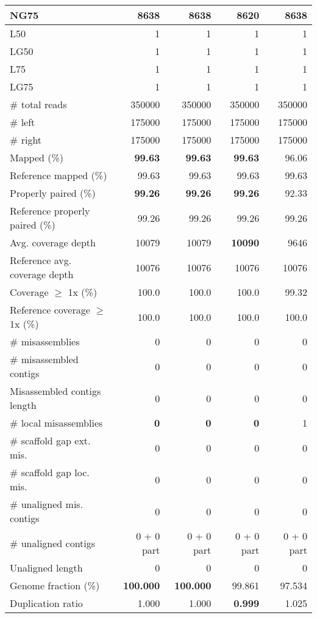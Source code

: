 \documentclass[12pt,a4paper]{article}
\begin{document}
\begin{table}[ht]
\begin{center}
\begin{tabular}{|l*{4}{|r}|}
NG75 & {\bf 8638} & {\bf 8638} & 8620 & {\bf 8638} \\ \hline
L50 & 1 & 1 & 1 & 1 \\ \hline
LG50 & 1 & 1 & 1 & 1 \\ \hline
L75 & 1 & 1 & 1 & 1 \\ \hline
LG75 & 1 & 1 & 1 & 1 \\ \hline
\# total reads & 350000 & 350000 & 350000 & 350000 \\ \hline
\# left & 175000 & 175000 & 175000 & 175000 \\ \hline
\# right & 175000 & 175000 & 175000 & 175000 \\ \hline
Mapped (\%) & {\bf 99.63} & {\bf 99.63} & {\bf 99.63} & 96.06 \\ \hline
Reference mapped (\%) & 99.63 & 99.63 & 99.63 & 99.63 \\ \hline
Properly paired (\%) & {\bf 99.26} & {\bf 99.26} & {\bf 99.26} & 92.33 \\ \hline
Reference properly paired (\%) & 99.26 & 99.26 & 99.26 & 99.26 \\ \hline
Avg. coverage depth & 10079 & 10079 & {\bf 10090} & 9646 \\ \hline
Reference avg. coverage depth & 10076 & 10076 & 10076 & 10076 \\ \hline
Coverage $\geq$ 1x (\%) & 100.0 & 100.0 & 100.0 & 99.32 \\ \hline
Reference coverage $\geq$ 1x (\%) & 100.0 & 100.0 & 100.0 & 100.0 \\ \hline
\# misassemblies & 0 & 0 & 0 & 0 \\ \hline
\# misassembled contigs & 0 & 0 & 0 & 0 \\ \hline
Misassembled contigs length & 0 & 0 & 0 & 0 \\ \hline
\# local misassemblies & {\bf 0} & {\bf 0} & {\bf 0} & 1 \\ \hline
\# scaffold gap ext. mis. & 0 & 0 & 0 & 0 \\ \hline
\# scaffold gap loc. mis. & 0 & 0 & 0 & 0 \\ \hline
\# unaligned mis. contigs & 0 & 0 & 0 & 0 \\ \hline
\# unaligned contigs & 0 + 0 part & 0 + 0 part & 0 + 0 part & 0 + 0 part \\ \hline
Unaligned length & 0 & 0 & 0 & 0 \\ \hline
Genome fraction (\%) & {\bf 100.000} & {\bf 100.000} & 99.861 & 97.534 \\ \hline
Duplication ratio & 1.000 & 1.000 & {\bf 0.999} & 1.025 \\ \hline

\end{tabular}
\end{center}
\end{table}
\end{document}
